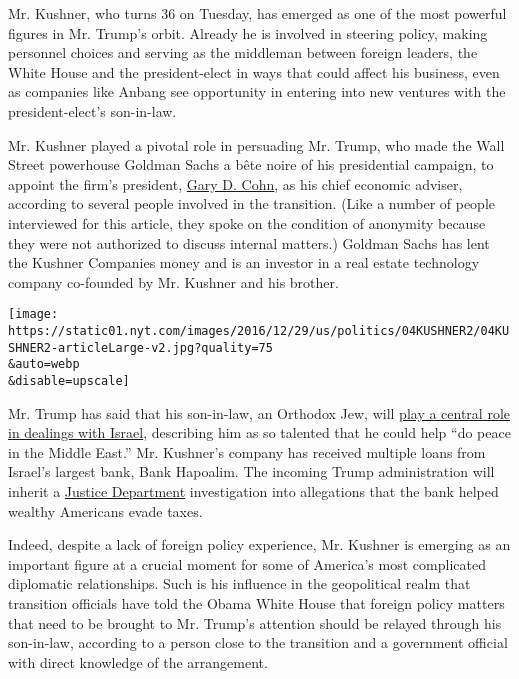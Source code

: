 Mr. Kushner, who turns 36 on Tuesday, has emerged as one of the most
powerful figures in Mr. Trump's orbit. Already he is involved in
steering policy, making personnel choices and serving as the middleman
between foreign leaders, the White House and the president-elect in ways
that could affect his business, even as companies like Anbang see
opportunity in entering into new ventures with the president-elect's
son-in-law.

Mr. Kushner played a pivotal role in persuading Mr. Trump, who made the
Wall Street powerhouse Goldman Sachs a bête noire of his presidential
campaign, to appoint the firm's president,
\href{https://www.nytimes.com/2016/12/09/business/dealbook/goldman-sachs-no-2-seen-as-a-top-economic-adviser-to-trump.html}{Gary
D. Cohn}, as his chief economic adviser, according to several people
involved in the transition. (Like a number of people interviewed for
this article, they spoke on the condition of anonymity because they were
not authorized to discuss internal matters.) Goldman Sachs has lent the
Kushner Companies money and is an investor in a real estate technology
company co-founded by Mr. Kushner and his brother.

\texttt{[image: https://static01.nyt.com/images/2016/12/29/us/politics/04KUSHNER2/04KUSHNER2-articleLarge-v2.jpg?quality=75\\\&auto=webp\\\&disable=upscale]}

Mr. Trump has said that his son-in-law, an Orthodox Jew, will
\href{https://www.nytimes.com/2016/11/23/world/middleeast/jared-kushner-cast-as-potential-player-on-israel-is-little-known-there.html}{play
a central role in dealings with Israel}, describing him as so talented
that he could help ``do peace in the Middle East.'' Mr. Kushner's
company has received multiple loans from Israel's largest bank, Bank
Hapoalim. The incoming Trump administration will inherit a
\href{http://www.reuters.com/article/us-bank-hapoalim-investigation-idUSKCN1260D7}{Justice
Department} investigation into allegations that the bank helped wealthy
Americans evade taxes.

Indeed, despite a lack of foreign policy experience, Mr. Kushner is
emerging as an important figure at a crucial moment for some of
America's most complicated diplomatic relationships. Such is his
influence in the geopolitical realm that transition officials have told
the Obama White House that foreign policy matters that need to be
brought to Mr. Trump's attention should be relayed through his
son-in-law, according to a person close to the transition and a
government official with direct knowledge of the arrangement.

